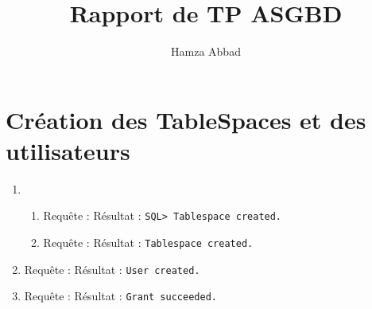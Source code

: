 \documentclass[12pt,a4paper]{article}
\author{Hamza Abbad}
\title{Rapport de TP ASGBD}
\begin{document}
\section{Création des TableSpaces et des utilisateurs}
	\begin{enumerate}
		\item
		\begin{enumerate}
			\item Requête : 
				Résultat : \texttt{SQL> Tablespace created.}
			\item Requête : 
			Résultat : \texttt{Tablespace created.}
		\end{enumerate}
		\item Requête : 
			Résultat : \texttt{User created.}
		\item Requête : 
			Résultat : \texttt{Grant succeeded.}
	\end{enumerate}
\end{document}
